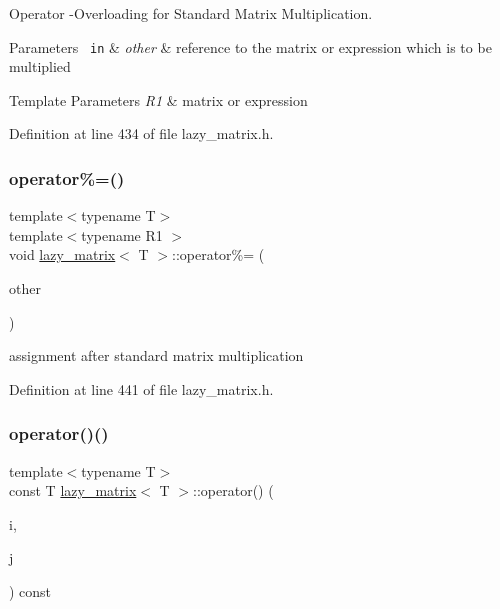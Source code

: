 Operator -\/Overloading for Standard Matrix Multiplication. 


\begin{DoxyParams}[1]{Parameters}
\mbox{\texttt{ in}}  & {\em other} & reference to the matrix or expression which is to be multiplied\\
\hline
\end{DoxyParams}

\begin{DoxyTemplParams}{Template Parameters}
{\em R1} & matrix or expression \\
\hline
\end{DoxyTemplParams}


Definition at line 434 of file lazy\+\_\+matrix.\+h.

\mbox{\label{classlazy__matrix_a6bf0976366215515282bea034b863489}} 
\subsubsection{\texorpdfstring{operator\%=()}{operator\%=()}}
{\footnotesize\ttfamily template$<$typename T$>$ \\
template$<$typename R1 $>$ \\
void \mbox{\hyperlink{classlazy__matrix}{lazy\+\_\+matrix}}$<$ T $>$\+::operator\%= (\begin{DoxyParamCaption}\item[{const R1 \&}]{other }\end{DoxyParamCaption})\hspace{0.3cm}{\ttfamily [inline]}}



assignment after standard matrix multiplication 



Definition at line 441 of file lazy\+\_\+matrix.\+h.

\mbox{\label{classlazy__matrix_a6d81b29ae59ada2332c1b16a889e3350}} 
\subsubsection{\texorpdfstring{operator()()}{operator()()}\hspace{0.1cm}{\footnotesize\ttfamily [1/2]}}
{\footnotesize\ttfamily template$<$typename T$>$ \\
const T \mbox{\hyperlink{classlazy__matrix}{lazy\+\_\+matrix}}$<$ T $>$\+::operator() (\begin{DoxyParamCaption}\item[{const std\+::size\+\_\+t}]{i,  }\item[{const std\+::size\+\_\+t}]{j }\end{DoxyParamCaption}) const\hspace{0.3cm}{\ttfamily [inline]}}

